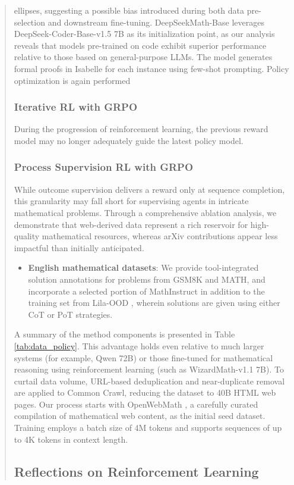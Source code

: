 \begin{abstract}
\begin{itemize}[topsep=0pt]
\begin{itemize}[topsep=0pt]
\begin{itemize}[topsep=0pt]
ellipses, suggesting a possible bias introduced during both data pre-selection and downstream fine-tuning. DeepSeekMath-Base leverages DeepSeek-Coder-Base-v1.5 7B \citep{deepseek-coder} as its initialization point, as our analysis reveals that models pre-trained on code exhibit superior performance relative to those based on general-purpose LLMs. The model generates formal proofs in Isabelle for each instance using few-shot prompting. Policy optimization is again performed

\subsubsection{Iterative RL with GRPO} During the progression of reinforcement learning, the previous reward model may no longer adequately guide the latest policy model. \subsubsection{Process Supervision RL with GRPO} 
While outcome supervision delivers a reward only at sequence completion, this granularity may fall short for supervising agents in intricate mathematical problems. Through a comprehensive ablation analysis, we demonstrate that web-derived data represent a rich reservoir for high-quality mathematical resources, whereas arXiv contributions appear less impactful than initially anticipated. \begin{itemize}[topsep=0pt]
    \item \textbf{English mathematical datasets}: We provide tool-integrated solution annotations for problems from GSM8K and MATH, and incorporate a selected portion of MathInstruct \citep{MathInstruct} in addition to the training set from Lila-OOD \citep{lila}, wherein solutions are given using either CoT or PoT strategies. \end{itemize}

A summary of the method components is presented in Table \ref{tab:data_policy}. This advantage holds even relative to much larger systems (for example, Qwen 72B) or those fine-tuned for mathematical reasoning using reinforcement learning (such as WizardMath-v1.1 7B). To curtail data volume, URL-based deduplication and near-duplicate removal are applied to Common Crawl, reducing the dataset to 40B HTML web pages. Our process starts with OpenWebMath \citep{openwebmath}, a carefully curated compilation of mathematical web content, as the initial seed dataset. Training employs a batch size of 4M tokens and supports sequences of up to 4K tokens in context length. \subsection{Reflections on Reinforcement Learning}

\end{itemize}
\end{itemize}
\end{itemize}
\end{abstract}
